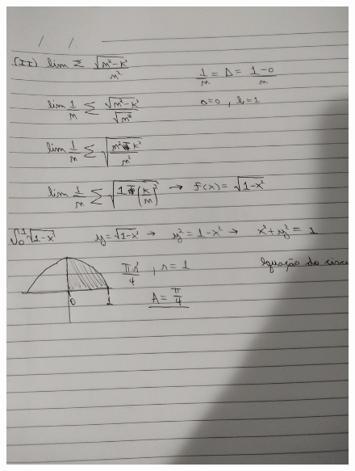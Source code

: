 \documentclass[12pt]{article}
\begin{document}
\begin{figure}[h!]
	\includegraphics[scale=0.14]{q12}
\end{figure}
\end{document}
